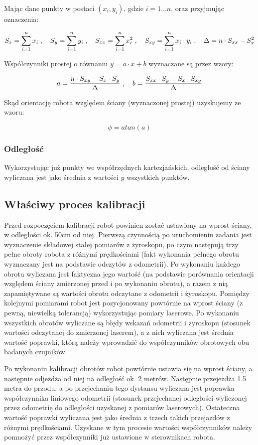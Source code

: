 Mając dane punkty w postaci $(x_i, y_i)$, gdzie $i=1\ldots n$, oraz przyjmując
oznaczenia:

\[
S_x = \sum_{i=1}^n x_i \; , \quad
S_y = \sum_{i=1}^n y_i \; , \quad
S_{xx} = \sum_{i=1}^n x_i^2 \; , \quad
S_{xy} = \sum_{i=1}^n x_i \cdot y_i \; , \quad
\Delta = n \cdot S_{xx} - S_x^2
\]

Współczynniki prostej o równaniu $y=a\cdot x+b$ wyznaczane są przez wzory:

\[
a = \frac{n \cdot S_{xy} - S_x \cdot S_y}{\Delta} \; , \quad
b = \frac{S_{xx} \cdot S_y - S_x \cdot S_{xy}}{\Delta}
\]

Skąd orientację robota względem ściany (wyznaczonej prostej) uzyskujemy ze
wzoru:

\[
\phi=atan(a)
\]

\subsubsection{Odległość}

Wykorzystując już punkty we współrzędnych kartezjańskich, odległość od ściany
wyliczana jest jako średnia z wartości $y$ wszystkich punktów.

\subsection{Właściwy proces kalibracji}

Przed rozpoczęciem kalibracji robot powinien zostać ustawiony na wprost ściany,
w odległości ok. 50cm od niej. Pierwszą czynnością po uruchomieniu zadania jest
wyznaczenie składowej stałej pomiarów z żyroskopu, po czym następują trzy
pełne obroty robota z różnymi prędkościami (fakt wykonania pełnego obrotu
wyznaczany jest na podstawie odczytów z odometrii). Po wykonaniu każdego obrotu
wyliczana jest faktyczna jego wartość (na podstawie porównania orientacji
względem ściany zmierzonej przed i po wykonaniu obrotu), a razem z nią
zapamiętywane są wartości obrotu odczytane z odometrii i żyroskopu. Pomiędzy
kolejnymi pomiarami robot jest pozycjonowany powtórnie na wprost ściany (z
pewną, niewielką tolerancją) wykorzystując pomiary laserowe. Po wykonaniu
wszystkich obrotów wyliczane są błędy wskazań odometrii i żyroskopu (stosunek
wartości odczytanej do zmierzonej laserem), a z nich wyliczana jest średnia
wartość poprawki, którą należy wprowadzić do współczynników obrotowych obu
badanych czujników.

Po wykonaniu kalibracji obrotów robot powtórnie ustawia się na wprost ściany, a
następnie odjeżdża od niej na odległość ok. 2 metrów. Następnie przejeżdża 1.5
metra do przodu, a po przejechaniu tego dystansu wyliczana jest poprawka
współczynnika liniowego odometrii (stosunek przejechanej odległości wyliczonej
przez odometrię do odległości uzyskanej z pomiarów laserowych). Ostateczna
wartość poprawki wyliczana jest jako średnia z trzech takich przejazdów z
różnymi prędkościami. Uzyskane w tym procesie wartości współczynników należy
pomnożyć przez współczynniki już ustawione w sterownikach robota.



